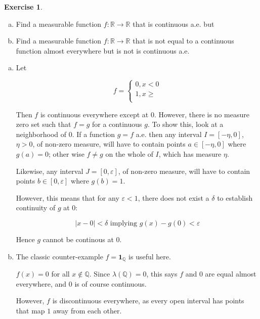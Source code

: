 \documentclass[11pt,oneside]{article}
\numberwithin{equation}{section}
\theoremstyle{definition}
\newtheorem{exercise}{Exercise}
\def\RR{\mathbb{R}}
\def\QQ{\mathbb{Q}}
\def\one{\mathbf{1}}
\begin{document}
\begin{exercise}
  \begin{enumerate}[(a)]
  \item
    Find a measurable function $f: \RR \to \RR$ that is continuous
    a.e. but 
  \item
    Find a measurable function $f: \RR \to \RR$ that is not equal to a
    continuous function almost everywhere but is not is continuous a.e.
  \end{enumerate}
\end{exercise}
\begin{solution}
  \begin{enumerate}[(a)]
  \item
    Let

    \[
    f = \begin{cases}
      0, x < 0 \\
      1, x \geq \\
    \end{cases}
    \]

    Then $f$ is continuous everywhere except at 0.  However, there is
    no measure zero set such that $f = g$ for a continuous $g$.  To
    show this, look at a neighborhood of $0$.  If a function $g = f$
    a.e. then any interval $I = [-\eta, 0]$, $\eta > 0$, of non-zero measure,
    will have to contain points $a \in [ -\eta, 0]$ where $g(a) = 0$; other
    wise $f \neq g$ on the whole of $I$, which has measure $\eta$.

    Likewise, any interval $J = [0, \varepsilon]$, of non-zero measure, will
    have to contain points $b \in [0, \varepsilon]$ where $g(b) = 1$.

    However, this means that for any $ \varepsilon < 1$, there does not exist a
    $\delta$ to establish continuity of $g$ at $0$:

    \[
    | x - 0 | < \delta \textrm{ implying } g(x) - g(0) < \varepsilon
    \]

    Hence $g$ cannot be continous at 0.  
    
    
  \item
    The classic counter-example $ f = \one_{\QQ}$ is useful here.

    $f(x) = 0$ for all $x \notin \QQ$.  Since $\lambda(\QQ) = 0$, this
    says $f$ and $0$ are equal almost everywhere, and $0$ is of course
    continuous.

    However, $f$ is discontinuous everywhere, as every open interval has
    points that map $1$ away from each other.  
    
  \end{enumerate}
\end{solution}
\end{document}
